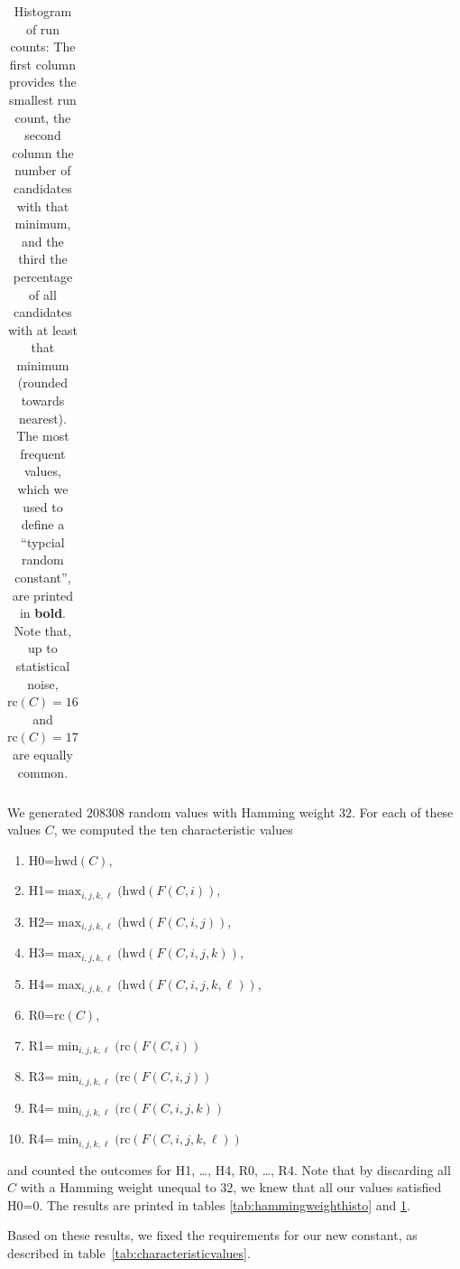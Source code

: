 \documentclass[11pt,twoside]{article}
\begin{document}
\begin{table}[htbp]
\begin{tabular}{rrr}
  \end{tabular}

  \caption{Histogram of run counts: 
    The first column provides the smallest run count, the second column the 
    number
    of candidates with that minimum, and the third the percentage of all
    candidates with at least that minimum (rounded towards nearest). The most
    frequent values, which we used to define a ``typcial random constant'',
    are printed in \textbf{bold}.
    Note that, up to statistical noise, $\mbox{rc}(C)=16$ and
    $\mbox{rc}(C)=17$ are equally common.}

  \label{tab:runcounthisto}
\end{table}



We generated $208308$ random values with Hamming weight $32$. For each of
these values $C$, we computed the ten characteristic values
\begin{enumerate}
  \item H0=$\mbox{hwd}(C)$,
  \item H1=$\max_{i,j,k,\ell}(\mbox{hwd}(F(C,i))$,
  \item H2=$\max_{i,j,k,\ell}(\mbox{hwd}(F(C,i,j))$,
  \item H3=$\max_{i,j,k,\ell}(\mbox{hwd}(F(C,i,j,k))$,
  \item H4=$\max_{i,j,k,\ell}(\mbox{hwd}(F(C,i,j,k,\ell))$,

  \item R0=$\mbox{rc}(C)$,
  \item R1=$\min_{i,j,k,\ell}(\mbox{rc}(F(C,i))$
  \item R3=$\min_{i,j,k,\ell}(\mbox{rc}(F(C,i,j))$
  \item R4=$\min_{i,j,k,\ell}(\mbox{rc}(F(C,i,j,k))$
  \item R4=$\min_{i,j,k,\ell}(\mbox{rc}(F(C,i,j,k,\ell))$
\end{enumerate}
and counted the outcomes for H1, \ldots, H4, R0, \ldots, R4. Note that by
discarding all $C$ with a Hamming weight unequal to 32, we knew that all our
values satisfied H0=0. The results are printed in
tables \ref{tab:hammingweighthisto} and \ref{tab:runcounthisto}.




Based on these results, we fixed the requirements for our new constant, as
described in table~\ref{tab:characteristicvalues}. 
\end{document}
